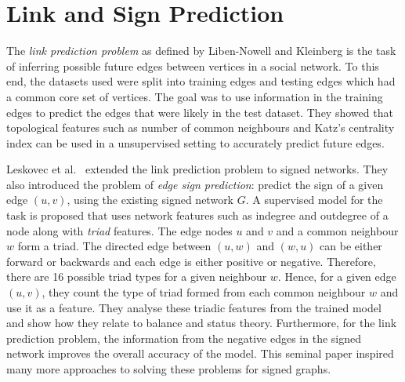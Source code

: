 \section{Link and Sign Prediction}
\label{sec:link-prediction}
The \textit{link prediction problem} as defined by Liben-Nowell and Kleinberg \cite{liben-nowell2007the} is the task of inferring possible future edges between vertices in a social network.
To this end, the datasets used were split into training edges and testing edges which had a common core set of vertices.
The goal was to use information in the training edges to predict the edges that were likely in the test dataset.
They showed that topological features such as number of common neighbours and Katz's centrality index can be used in a unsupervised setting to accurately predict future edges.

Leskovec et al.\ \cite{leskovec2010predicting} extended the link prediction problem to signed networks.
They also introduced the problem of \textit{edge sign prediction}: predict the sign of a given edge $(u,v)$, using the existing signed network $G$.
A supervised model for the task is proposed that uses network features such as indegree and outdegree of a node along with \textit{triad} features.
The edge nodes $u$ and $v$ and a common neighbour $w$ form a triad.
The directed edge between $(u,w)$ and $(w,u)$ can be either forward or backwards and each edge is either positive or negative.
Therefore, there are 16 possible triad types for a given neighbour $w$.
Hence, for a given edge $(u,v)$, they count the type of triad formed from each common neighbour $w$ and use it as a feature.
They analyse these triadic features from the trained model and show how they relate to balance and status theory.
Furthermore, for the link prediction problem, the information from the negative edges in the signed network improves the overall accuracy of the model.
This seminal paper inspired many more approaches to solving these problems for signed graphs.   


